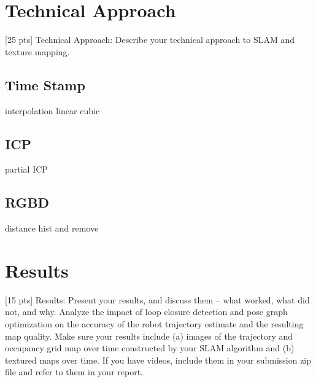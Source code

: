 \documentclass[conference]{IEEEtran}
\begin{document}
\section{Technical Approach}
[25 pts] Technical Approach: Describe your technical approach to SLAM and texture mapping.
\subsection{Time Stamp}
interpolation 
linear 
cubic


\subsection{ICP}
partial ICP

\subsection{RGBD}
distance hist and remove


\section{Results}
[15 pts] Results: Present your results, and discuss them – what worked, what did not, and why.
Analyze the impact of loop closure detection and pose graph optimization on the accuracy of the robot
trajectory estimate and the resulting map quality. Make sure your results include (a) images of the
trajectory and occupancy grid map over time constructed by your SLAM algorithm and (b) textured
maps over time. If you have videos, include them in your submission zip file and refer to them in your
report.
\end{document}
